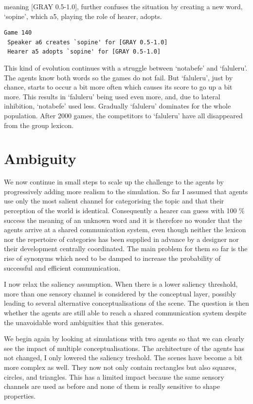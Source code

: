 meaning [GRAY 0.5-1.0], further confuses the situation by 
creating a new word, `sopine', which {\bfshape  a5}, playing
the role of hearer, adopts. 
\begin{verbatim}
Game 140
 Speaker a6 creates `sopine' for [GRAY 0.5-1.0]
 Hearer a5 adopts `sopine' for [GRAY 0.5-1.0]
\end{verbatim}
This kind of evolution continues with a struggle between 
`notabefe' and `faluleru'. The agents know both 
words so the games do not fail. But `faluleru', 
just by chance, starts to occur a bit more often
which causes its score to go up a bit more. 
This results in `faluleru' being used even more, 
and, due to lateral inhibition, `notabefe' used 
less. Gradually `faluleru' dominates for 
the whole population. 
After 2000 games, the competitors to `faluleru' have 
all disappeared from the group lexicon. 

\section{Ambiguity} 

We now continue in small steps to scale up the
challenge to the agents by progressively 
adding more realism to the simulation. So far I 
assumed that agents use only 
the most salient channel for categorising the topic
and that their perception of the world is identical.
Consequently a hearer can guess with 100 \% success the
meaning of an unknown word and 
it is therefore no wonder that the agents arrive at a 
shared communication system, 
even though neither the lexicon nor the repertoire
of categories has been supplied in advance by a 
designer nor their development centrally
coordinated. The main problem for them so far is 
the rise of synonyms which need to be damped to 
increase the probability of successful and 
efficient communication. 

I now relax the saliency assumption. When 
there is a lower saliency threshold, more than one
sensory channel is considered by the conceptual 
layer, possibly leading to several alternative
conceptualisations of the scene. The question is 
then whether the agents are still able to reach 
a shared communication system despite the unavoidable
word ambiguities that this generates. 

We begin again by looking at simulations
with two agents so that we 
can clearly see the impact of multiple conceptualisations. 
The architecture of the agents has not changed, I only 
lowered the saliency treshold. 
The scenes have become a bit more complex as well. They 
now not only contain rectangles but also squares, circles, 
and triangles. This has a limited impact because the 
same sensory channels are used as before and none of them 
is really sensitive to shape properties. 


